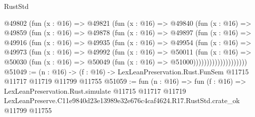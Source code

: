 \begin{lexlean}{RustStd}
\begin{coremodule}
              @49802
                (fun (x : @16) =>
                @49821
                  (fun (x : @16) =>
                  @49840
                    (fun (x : @16) =>
                    @49859
                      (fun (x : @16) =>
                      @49878
                        (fun (x : @16) =>
                        @49897
                          (fun (x : @16) =>
                          @49916
                            (fun (x : @16) =>
                            @49935
                              (fun (x : @16) =>
                              @49954
                                (fun (x : @16) =>
                                @49973
                                  (fun (x : @16) =>
                                  @49992
                                    (fun (x : @16) =>
                                    @50011
                                      (fun (x : @16) =>
                                      @50030
                                        (fun (x : @16) =>
                                        @50049 (fun (x : @16) => @51000))))))))))))))))))))
@51049 := (n : @16) ->
  (f : @16) -> LexLeanPreservation.Rust.FunSem @11715 @11717 @11719 @11799 @11755
@51059 := fun (n : @16) =>
  fun (f : @16) =>
  LexLeanPreservation.Rust.simulate
    @11715
    @11717
    @11719
    LexLeanPreserve.C11e9840d23e13989e32e676c4caf4624.R17.RustStd.crate_ok
    @11799
    @11755
\end{coremodule}
\end{lexlean}
